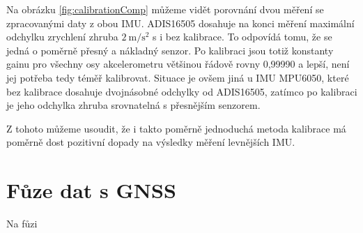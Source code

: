 Na obrázku \ref{fig:calibrationComp} můžeme vidět porovnání dvou měření se zpracovanými daty z obou IMU. ADIS16505 dosahuje na konci měření maximální odchylku zrychlení zhruba $ \SI[per-mode = symbol]{2}{\metre\per\second\squared} $ s i bez kalibrace. To odpovídá tomu, že se jedná o poměrně přesný a nákladný senzor. Po kalibraci jsou totiž konstanty gainu pro všechny osy akcelerometru většinou řádově rovny 0,99990 a lepší, není jej potřeba tedy téměř kalibrovat. Situace je ovšem jiná u IMU MPU6050, které bez kalibrace dosahuje dvojnásobné odchylky od ADIS16505, zatímco po kalibraci je jeho odchylka zhruba srovnatelná s přesnějším senzorem.

Z tohoto můžeme usoudit, že i takto poměrně jednoduchá metoda kalibrace má poměrně dost pozitivní dopady na výsledky měření levnějších IMU.

\section{Fůze dat s GNSS}
Na fůzi


